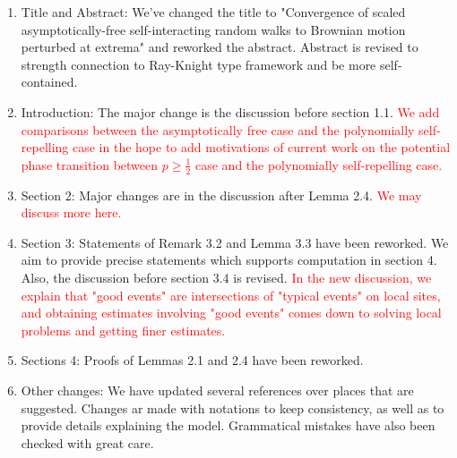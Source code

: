 \documentclass[11pt,a4paper]{article}
\numberwithin{equation}{section}
\def\TBF#1{\textcolor{red}{#1}} %
\begin{document}
	\begin{enumerate}
		\item Title and Abstract: We've changed the title to "Convergence of scaled asymptotically-free
		self-interacting random walks to Brownian motion
		perturbed at extrema" and reworked the abstract. Abstract is revised to strength connection to Ray-Knight type framework and be more self-contained.
		
		\item Introduction: The major change is the discussion before section 1.1. \TBF{We add comparisons between the asymptotically free case and the polynomially self-repelling case in the hope to add motivations of current work on the potential phase transition between $p\geq \frac{1}{2}$ case and the polynomially self-repelling case.} 
		
		\item Section 2: Major changes are in the discussion after Lemma 2.4. \TBF{We may discuss more here.}
		
		
		\item Section 3:  Statements of Remark 3.2 and Lemma 3.3 have been reworked. We aim to provide precise statements which supports computation in section 4.
		Also, the discussion before section 3.4 is revised. \TBF{In the new discussion, we explain that "good events" are intersections of "typical events" on local sites, and obtaining estimates involving "good events" comes down to solving local problems and getting finer estimates.} 
		
		
		
		\item Sections 4: Proofs of Lemmas 2.1 and 2.4 have been reworked. 
		
		\item Other changes: We have updated several references over places that are suggested. Changes ar made with notations to keep consistency, as well as to provide details explaining the model. Grammatical mistakes have also been checked with great care.  
		
	\end{enumerate}
	
	\newpage
\end{document}
